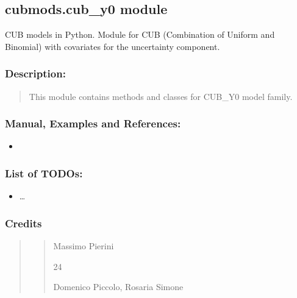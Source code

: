 \documentclass[letterpaper,10pt,english]{sphinxmanual}
\begin{document}
\subsection{cubmods.cub\_y0 module}
\label{\detokenize{cubmods:module-cubmods.cub_y0}}\label{\detokenize{cubmods:cubmods-cub-y0-module}}\label{\detokenize{cubmods:cuby0-module}}
\sphinxAtStartPar
CUB models in Python.
Module for CUB (Combination of Uniform
and Binomial) with covariates for the uncertainty component.


\subsubsection{Description:}
\label{\detokenize{cubmods:id6}}\begin{quote}

\sphinxAtStartPar
This module contains methods and classes
for CUB\_Y0 model family.
\end{quote}


\subsubsection{Manual, Examples and References:}
\label{\detokenize{cubmods:id7}}\begin{itemize}
\item {} 
\sphinxAtStartPar
{}

\end{itemize}


\subsubsection{List of TODOs:}
\label{\detokenize{cubmods:id8}}\begin{itemize}
\item {} 
\sphinxAtStartPar
…

\end{itemize}


\subsubsection{Credits}
\label{\detokenize{cubmods:id9}}\begin{quote}
\begin{quote}\begin{description}
\sphinxAtStartPar
Massimo Pierini

\sphinxhyphen{}24

\sphinxAtStartPar
Domenico Piccolo, Rosaria Simone

\sphinxAtStartPar
{}

\end{description}\end{quote}
\end{quote}
\end{document}

